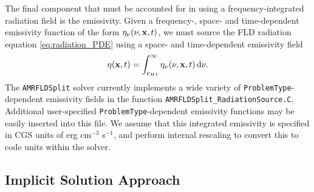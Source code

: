 \documentclass[letterpaper,10pt]{article}
\renewcommand{\(}{\left(}
\renewcommand{\)}{\right)}
\newcommand{\xvec}{{\bf x}}
\begin{document}
The final component that must be accounted for in using a
frequency-integrated radiation field is the emissivity.  Given a
frequency-, space- and time-dependent emissivity function of the form
$\eta_{\nu}(\nu,\xvec,t)$, we must source the FLD radiation equation
\eqref{eq:radiation_PDE} using a space- and time-dependent emissivity
field 
\begin{equation}
\label{eq:emissivity}
  \eta(\xvec,t) =
  \int_{\nu_{HI}}^{\infty}\eta_{\nu}(\nu,\xvec,t)\,\mathrm{d}\nu. 
\end{equation}
The {\tt AMRFLDSplit} solver currently implements a wide variety of
{\tt ProblemType}-dependent emissivity fields in the function 
{\tt AMRFLDSplit\_RadiationSource.C}.  Additional user-specified 
{\tt ProblemType}-dependent emissivity functions may be easily 
inserted into this file.  We assume that this integrated emissivity is
specified in CGS units of erg cm$^{-3}$ s$^{-1}$, and perform internal
rescaling to convert this to code units within the solver.




\subsection{Implicit Solution Approach}
\label{sec:AMRFLDSplit_rad_solve}
\end{document}
